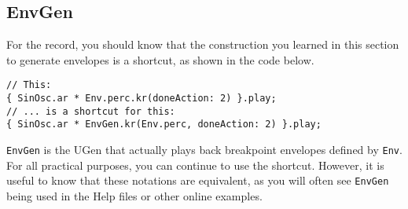 \subsection{EnvGen}

For the record, you should know that the construction you learned in this section to generate envelopes is a shortcut, as shown in the code below.

\begin{lstlisting}[style=SuperCollider-IDE, basicstyle=\scttfamily\footnotesize]
// This:
{ SinOsc.ar * Env.perc.kr(doneAction: 2) }.play;
// ... is a shortcut for this:
{ SinOsc.ar * EnvGen.kr(Env.perc, doneAction: 2) }.play;
\end{lstlisting}

\texttt{EnvGen} is the UGen that actually plays back breakpoint envelopes defined by \texttt{Env}. For all practical purposes, you can continue to use the shortcut. However, it is useful to know that these notations are equivalent, as you will often see \texttt{EnvGen} being used in the Help files or other online examples.